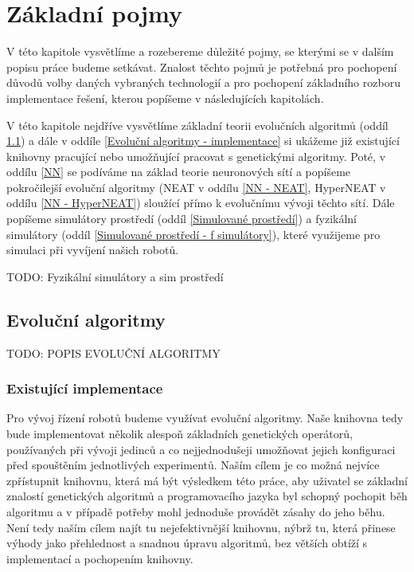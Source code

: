 
\chapter{Základní pojmy}

V této kapitole vysvětlíme a rozebereme důležité pojmy, se kterými se v dalším
popisu práce budeme setkávat. Znalost těchto pojmů je potřebná pro pochopení
důvodů volby daných vybraných technologií a pro pochopení základního rozboru
implementace řešení, kterou popíšeme v následujících kapitolách.

V této kapitole nejdříve vysvětlíme základní teorii evolučních algoritmů (oddíl
\ref{Evoluční algoritmy}) a dále v oddíle \ref{Evoluční algoritmy -
implementace} si ukážeme již existující knihovny pracující nebo umožňující
pracovat s genetickými algoritmy. Poté, v oddílu \ref{NN} se podíváme na základ
teorie neuronových sítí a popíšeme pokročilejší evoluční algoritmy (NEAT v
oddílu \ref{NN - NEAT}, HyperNEAT v oddílu \ref{NN - HyperNEAT}) sloužící přímo
k evolučnímu vývoji těchto sítí. Dále popíšeme simulátory prostředí (oddíl
\ref{Simulované prostředí}) a fyzikální simulátory (oddíl \ref{Simulované
prostředí - f simulátory}), které využijeme pro simulaci při vyvíjení našich
robotů.

TODO: Fyzikální simulátory a sim prostředí

\section{Evoluční algoritmy} \label{Evoluční algoritmy}

TODO: POPIS EVOLUČNÍ ALGORITMY

\subsection{Existující implementace} \label{Evoluční algoritmy - implementace}

Pro vývoj řízení robotů budeme využívat evoluční algoritmy. Naše knihovna tedy
bude implementovat několik alespoň základních genetických operátorů,
používaných při vývoji jedinců a co nejjednodušeji umožňovat jejich konfiguraci
před spouštěním jednotlivých experimentů. Naším cílem je co možná nejvíce
zpřístupnit knihovnu, která má být výsledkem této práce, aby uživatel se
základní znalostí genetických algoritmů a programovacího jazyka byl schopný
pochopit běh algoritmu a v případě potřeby mohl jednoduše provádět zásahy do
jeho běhu. Není tedy naším cílem najít tu nejefektivnější knihovnu, nýbrž tu,
která přinese výhody jako přehlednost a snadnou úpravu algoritmů, bez větších
obtíží s implementací a pochopením knihovny.


